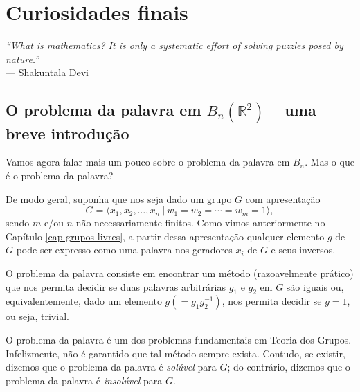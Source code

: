 \chapter[Curiosidades finais]{Curiosidades finais}
\label{cap-6}
\chaptermark{}
%
\hfill%
\begin{minipage}{10cm}
\begin{flushright}
\rightskip=0.5cm
\textit{``What is mathematics? It is only a systematic effort of solving puzzles posed by nature.''}
\\[0.1cm]
\rightskip=0.5cm
--- Shakuntala Devi
\end{flushright}
\end{minipage}

\section{O problema da palavra em \texorpdfstring{$B_n(\mathbb{R}^2)$}{BnR2} -- uma breve introdução}
\label{secao o problema da palavra}
	Vamos agora falar mais um pouco sobre o problema da palavra em $B_n$. Mas o que é o problema da palavra?
	
	\par\vspace{0.3cm} De modo geral, suponha que nos seja dado um grupo $G$ com apresentação
	\begin{equation*}
	    G = \langle x_1, x_2, \dots, x_n \ | \ w_1 = w_2 = \cdots = w_m = 1 \rangle,
	\end{equation*}
	sendo $m$ e/ou $n$ não necessariamente finitos. Como vimos anteriormente no 
	Capítulo \ref{cap-grupos-livres}, a partir dessa apresentação qualquer elemento $g$ de $G$ pode ser 
	expresso como uma palavra nos geradores $x_i$ de $G$ e seus inversos. 
	
	\par\vspace{0.3cm} O problema da palavra consiste em encontrar um método (razoavelmente prático) que 
	nos permita decidir se duas palavras arbitrárias $g_1$ e $g_2$ em $G$ são iguais ou, equivalentemente, 
	dado um elemento $g (=g_1g_2^{-1})$, nos permita decidir se $g=1$, ou seja, trivial.
	
	\par\vspace{0.3cm} O problema da palavra é um dos problemas fundamentais em Teoria dos Grupos. 
	Infelizmente, não é garantido que tal método sempre exista. Contudo, se existir, dizemos que o problema 
	da palavra é \textit{solúvel} para $G$; do contrário, dizemos que o problema da palavra é 
	\textit{insolúvel} para $G$.  
	
